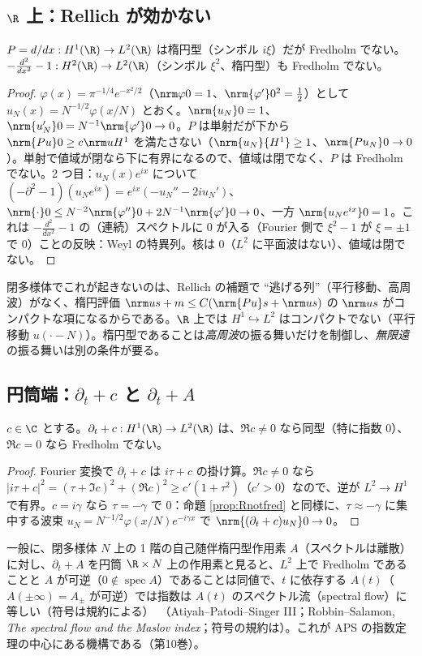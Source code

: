 \subsection{$\R$ 上：Rellich が効かない}
\begin{prop}\label{prop:Rnotfred}\tP
$P=d/dx:H^1(\R)\to L^2(\R)$ は楕円型（シンボル $i\xi$）だが Fredholm でない。$-\frac{d^2}{dx^2}-1:H^2(\R)\to L^2(\R)$（シンボル $\xi^2$、楕円型）も Fredholm でない。
\end{prop}
\begin{proof}
$\varphi(x)=\pi^{-1/4}e^{-x^2/2}$（$\nrm\varphi0=1$、$\nrm{\varphi'}0^2=\frac12$）として $u_N(x)=N^{-1/2}\varphi(x/N)$ とおく。$\nrm{u_N}0=1$、$\nrm{u_N'}0=N^{-1}\nrm{\varphi'}0\to0$。$P$ は単射だが下から $\nrm{Pu}0\ge c\nrm u{H^1}$ を満たさない（$\nrm{u_N}{H^1}\ge1$、$\nrm{Pu_N}0\to0$）。単射で値域が閉なら下に有界になるので、値域は閉でなく、$P$ は Fredholm でない。2 つ目：$u_N(x)e^{ix}$ について $(-\partial^2-1)(u_Ne^{ix})=e^{ix}(-u_N''-2iu_N')$、$\nrm{\cdot}0\le N^{-2}\nrm{\varphi''}0+2N^{-1}\nrm{\varphi'}0\to0$、一方 $\nrm{u_Ne^{ix}}0=1$。これは $-\frac{d^2}{dx^2}-1$ の（連続）スペクトルに $0$ が入る（Fourier 側で $\xi^2-1$ が $\xi=\pm1$ で $0$）ことの反映：Weyl の特異列。核は $0$（$L^2$ に平面波はない）、値域は閉でない。
\end{proof}
\noindent 閉多様体でこれが起きないのは、Rellich の補題で ``逃げる列''（平行移動、高周波）がなく、楕円評価 $\nrm u{s+m}\le C(\nrm{Pu}s+\nrm us)$ の $\nrm us$ がコンパクトな項になるからである。$\R$ 上では $H^1\hookrightarrow L^2$ はコンパクトでない（平行移動 $u(\cdot-N)$）。楕円型であることは\emph{高周波}の振る舞いだけを制御し、\emph{無限遠}の振る舞いは別の条件が要る。

\subsection{円筒端：$\partial_t+c$ と $\partial_t+A$}
\begin{prop}\label{prop:cyl}\tP
$c\in\C$ とする。$\partial_t+c:H^1(\R)\to L^2(\R)$ は、$\Re c\neq0$ なら同型（特に指数 $0$）、$\Re c=0$ なら Fredholm でない。
\end{prop}
\begin{proof}
Fourier 変換で $\partial_t+c$ は $i\tau+c$ の掛け算。$\Re c\ne0$ なら $|i\tau+c|^2=(\tau+\Im c)^2+(\Re c)^2\ge c'(1+\tau^2)$（$c'>0$）なので、逆が $L^2\to H^1$ で有界。$c=i\gamma$ なら $\tau=-\gamma$ で $0$：命題 \ref{prop:Rnotfred} と同様に、$\tau\approx-\gamma$ に集中する波束 $u_N=N^{-1/2}\varphi(x/N)e^{-i\gamma x}$ で $\nrm{(\partial_t+c)u_N}0\to0$。
\end{proof}
一般に、閉多様体 $N$ 上の 1 階の自己随伴楕円型作用素 $A$（スペクトルは離散）に対し、$\partial_t+A$ を円筒 $\R\times N$ 上の作用素と見ると、$L^2$ 上で Fredholm であることと $A$ が可逆（$0\notin\operatorname{spec}A$）であることは同値で、$t$ に依存する $A(t)$（$A(\pm\infty)=A_\pm$ が可逆）では指数は $A(t)$ のスペクトル流（spectral flow）に等しい（符号は規約による）\tC\ （Atiyah--Patodi--Singer III；Robbin--Salamon, \emph{The spectral flow and the Maslov index}；符号の規約は\tQ）。これが APS の指数定理の中心にある機構である（第10巻）。

